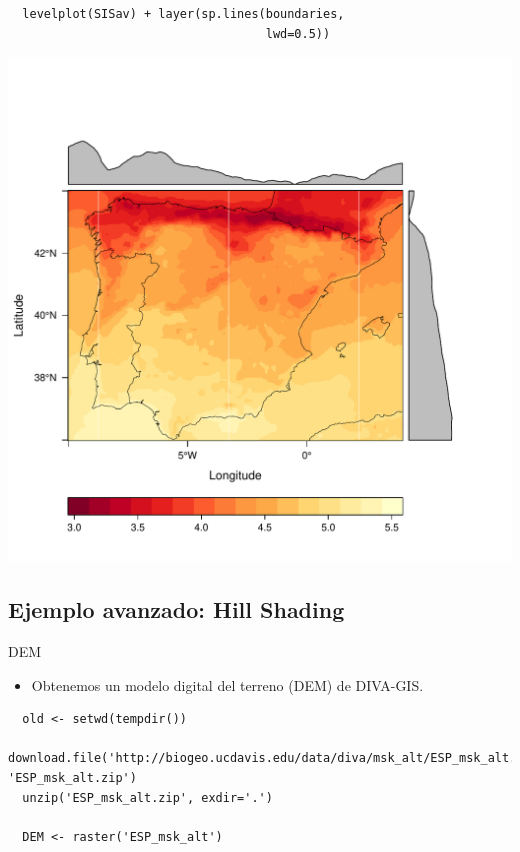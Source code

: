 \documentclass[xcolor={usenames,svgnames,dvipsnames}]{beamer}
\begin{document}
\begin{frame}[fragile,label=sec-2-2-4]{}
 \lstset{language=R,label= ,caption= ,numbers=none}
\begin{lstlisting}
  levelplot(SISav) + layer(sp.lines(boundaries,
                                    lwd=0.5))
\end{lstlisting}

\includegraphics[width=.9\linewidth]{figs/leveplotSISavBoundaries.pdf}
\end{frame}

\subsection{Ejemplo avanzado: Hill Shading}
\label{sec-2-3}
\begin{frame}[fragile,label=sec-2-3-1]{DEM}
 \begin{itemize}
\item Obtenemos un modelo digital del terreno (DEM) de DIVA-GIS.
\end{itemize}

\lstset{language=R,label= ,caption= ,numbers=none}
\begin{lstlisting}
  old <- setwd(tempdir())
  download.file('http://biogeo.ucdavis.edu/data/diva/msk_alt/ESP_msk_alt.zip', 'ESP_msk_alt.zip')
  unzip('ESP_msk_alt.zip', exdir='.')
  
  DEM <- raster('ESP_msk_alt')
\end{lstlisting}
\end{frame}
\end{document}
